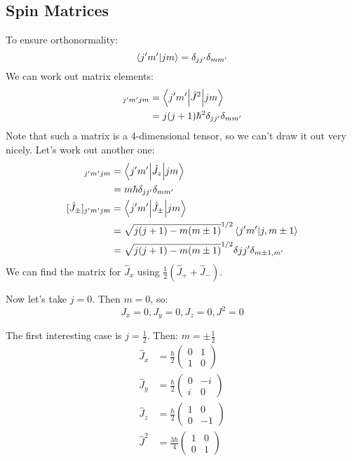\subsection{Spin Matrices}
To ensure orthonormality:
\[ \bra{j'm'}\ket{jm} = \delta_{j j'} \delta_{m m'} \]
We can work out matrix elements:
\begin{align*}
    [\hat{J}^2]_{j'm'jm} &= \mel**{j'm'}{\hat{J}^2}{jm} \\
    &= j(j + 1) \hbar^2 \delta_{j j'} \delta_{mm'}
\end{align*}
Note that such a matrix is a 4-dimensional tensor, so we can't draw it out very nicely. Let's work out another one:
\begin{align*}
    [\hat{J}_z]_{j'm'jm} &= \mel**{j'm'}{\hat{J}_z}{jm} \\
    &= m\hbar \delta_{j j'} \delta_{mm'} \\
    [\hat{J}_{\pm}]_{j'm'jm} &= \mel**{j'm'}{\hat{J}_{\pm}}{jm} \\
    &= \sqrt{j(j + 1) - m (m \pm 1)}^{1/2} \bra{j'm'}\ket{j, m \pm 1} \\
    &= \sqrt{j(j + 1) - m (m \pm 1)}^{1/2} \delta{j j'} \delta_{m \pm 1, m'} \\
\end{align*}
We can find the matrix for $\hat{J}_x$ using $\frac{1}{2}(\hat{J}_{+} + \hat{J}_{-})$.

Now let's take $j = 0$. Then $m = 0$, so:
\[ J_x = 0, J_y = 0, J_z = 0, J^2 = 0 \]

The first interesting case is $j = \frac{1}{2}$. Then: $m = \pm \frac{1}{2}$
\begin{align*}
    \hat{J}_x &= \frac{\hbar}{2} \begin{pmatrix}
        0 & 1 \\ 1 & 0
    \end{pmatrix} \\
    \hat{J}_y &= \frac{\hbar}{2} \begin{pmatrix}
        0 & -i \\ i & 0
    \end{pmatrix} \\
    \hat{J}_z &= \frac{\hbar}{2} \begin{pmatrix}
        1 & 0 \\ 0 & -1
    \end{pmatrix} \\
    \hat{J}^2 &= \frac{3\hbar}{4} \begin{pmatrix}
        1 & 0 \\ 0 & 1
    \end{pmatrix}
\end{align*}

